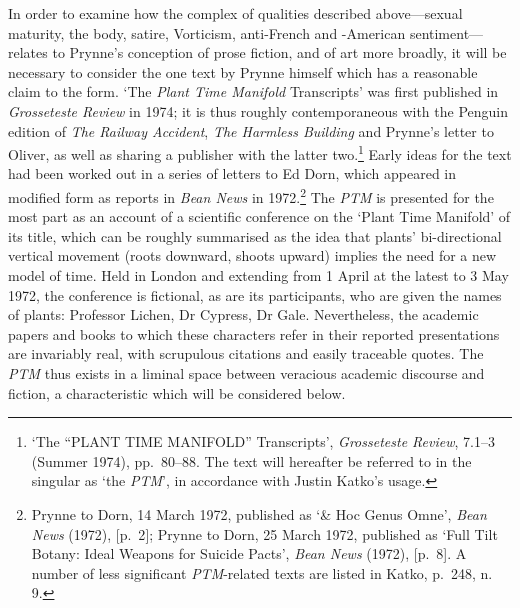 \documentclass[]{article}
\begin{document}
In order to examine how the complex of qualities described
above---sexual maturity, the body, satire, Vorticism, anti-French and
-American sentiment---relates to Prynne's conception of prose fiction,
and of art more broadly, it will be necessary to consider the one text
by Prynne himself which has a reasonable claim to the form. `The
\emph{Plant Time Manifold} Transcripts' was first published in
\emph{Grosseteste Review} in 1974; it is thus roughly contemporaneous
with the Penguin edition of \emph{The Railway Accident}, \emph{The
Harmless Building} and Prynne's letter to Oliver, as well as sharing a
publisher with the latter two.\footnote{`The ``PLANT TIME MANIFOLD''
  Transcripts', \emph{Grosseteste Review}, 7.1--3 (Summer 1974),
  pp.~80--88. The text will hereafter be referred to in the singular as
  `the \emph{PTM}', in accordance with Justin Katko's usage.} Early
ideas for the text had been worked out in a series of letters to Ed
Dorn, which appeared in modified form as reports in \emph{Bean News} in
1972.\footnote{Prynne to Dorn, 14 March 1972, published as `\& Hoc Genus
  Omne', \emph{Bean News} (1972), {[}p.~2{]}; Prynne to Dorn, 25 March
  1972, published as `Full Tilt Botany: Ideal Weapons for Suicide
  Pacts', \emph{Bean News} (1972), {[}p.~8{]}. A number of less
  significant \emph{PTM}-related texts are listed in Katko, p.~248, n.
  9.} The \emph{PTM} is presented for the most part as an account of a
scientific conference on the `Plant Time Manifold' of its title, which
can be roughly summarised as the idea that plants' bi-directional
vertical movement (roots downward, shoots upward) implies the need for a
new model of time. Held in London and extending from 1 April at the
latest to 3 May 1972, the conference is fictional, as are its
participants, who are given the names of plants: Professor Lichen, Dr
Cypress, Dr Gale. Nevertheless, the academic papers and books to which
these characters refer in their reported presentations are invariably
real, with scrupulous citations and easily traceable quotes. The
\emph{PTM} thus exists in a liminal space between veracious academic
discourse and fiction, a characteristic which will be considered below.
\end{document}
